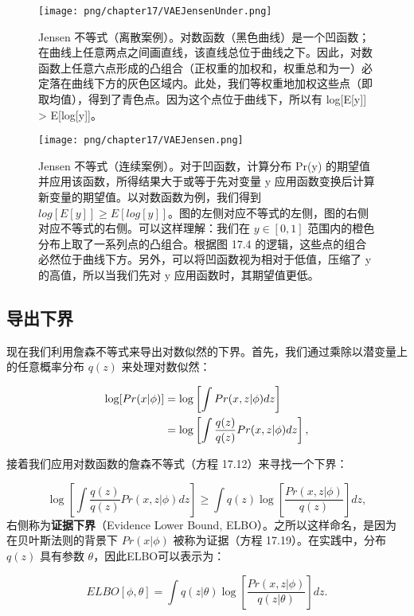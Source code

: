 \begin{figure}[ht!]
\centering
\texttt{[image: png/chapter17/VAEJensenUnder.png]}
\caption{Jensen 不等式（离散案例）。对数函数（黑色曲线）是一个凹函数；在曲线上任意两点之间画直线，该直线总位于曲线之下。因此，对数函数上任意六点形成的凸组合（正权重的加权和，权重总和为一）必定落在曲线下方的灰色区域内。此处，我们等权重地加权这些点（即取均值），得到了青色点。因为这个点位于曲线下，所以有 log[E[y]] > E[log[y]]。}
\end{figure}


\begin{figure}[ht!]
\centering
\texttt{[image: png/chapter17/VAEJensen.png]}
\caption{Jensen 不等式（连续案例）。对于凹函数，计算分布 Pr(y) 的期望值并应用该函数，所得结果大于或等于先对变量 y 应用函数变换后计算新变量的期望值。以对数函数为例，我们得到 \(log[E[y]] \geq E[log[y]]\)。图的左侧对应不等式的左侧，图的右侧对应不等式的右侧。可以这样理解：我们在 \(y \in [0, 1]\) 范围内的橙色分布上取了一系列点的凸组合。根据图 17.4 的逻辑，这些点的组合必然位于曲线下方。另外，可以将凹函数视为相对于低值，压缩了 y 的高值，所以当我们先对 y 应用函数时，其期望值更低。}
\end{figure}


\subsection{导出下界}

现在我们利用詹森不等式来导出对数似然的下界。首先，我们通过乘除以潜变量上的任意概率分布 \(q(z)\) 来处理对数似然：


\begin{align}
\log[Pr(x|\phi)] &= \log \left[ \int Pr(x, z|\phi) dz \right] \notag \\
&= \log \left[ \int \frac{q(z)}{q(z)} Pr(x, z|\phi) dz \right], 
\end{align} 


接着我们应用对数函数的詹森不等式（方程 17.12）来寻找一个下界：

\begin{equation}
\log \left[ \int \frac{q(z)}{q(z)} Pr(x, z|\phi) dz \right] \geq \int q(z) \log \left[ \frac{Pr(x, z|\phi)}{q(z)} \right] dz, 
\end{equation}
右侧称为\textbf{证据下界}（Evidence Lower Bound, ELBO）。之所以这样命名，是因为在贝叶斯法则的背景下 \(Pr(x|\phi)\) 被称为证据（方程 17.19）。在实践中，分布 \(q(z)\) 具有参数 \(\theta\)，因此ELBO可以表示为：

\begin{equation}
ELBO[\phi, \theta] = \int q(z|\theta) \log \left[ \frac{Pr(x, z|\phi)}{q(z|\theta)} \right] dz. 
\end{equation}

